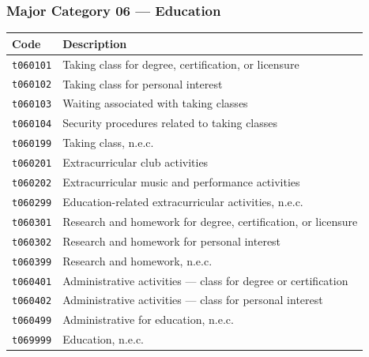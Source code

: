 \documentclass[11pt, a4paper]{article}
\begin{document}
\subsubsection*{Major Category 06 --- Education}
\begin{longtable}{L{3cm} L{13cm}}
\toprule \textbf{Code} & \textbf{Description} \\ \midrule \endhead
\bottomrule \endfoot
\texttt{t060101} & Taking class for degree, certification, or licensure \\
 \texttt{t060102} & Taking class for personal interest \\
\texttt{t060103} & Waiting associated with taking classes \\
 \texttt{t060104} & Security procedures related to taking classes \\
\texttt{t060199} & Taking class, n.e.c. \\
 \texttt{t060201} & Extracurricular club activities \\
\texttt{t060202} & Extracurricular music and performance activities \\
 \texttt{t060299} & Education-related extracurricular activities, n.e.c. \\
\texttt{t060301} & Research and homework for degree, certification, or licensure \\
 \texttt{t060302} & Research and homework for personal interest \\
\texttt{t060399} & Research and homework, n.e.c. \\
 \texttt{t060401} & Administrative activities --- class for degree or certification \\
\texttt{t060402} & Administrative activities --- class for personal interest \\
 \texttt{t060499} & Administrative for education, n.e.c. \\
\texttt{t069999} & Education, n.e.c. \\
\end{longtable}

\vspace{6cm}
\end{document}
